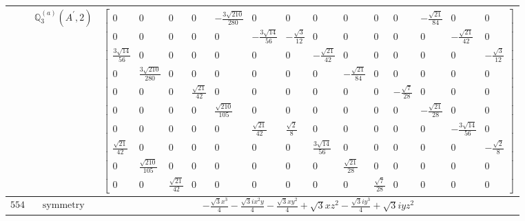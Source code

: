 \documentclass[fleqn,8pt,landscape]{jsarticle}
\begin{document}
\begin{longtable}{ccc}
$  $ & $ \mathbb{Q}_{3}^{(a)}(A^{\prime},2) $ & $ \begin{bmatrix} 0 & 0 & 0 & 0 & - \frac{3 \sqrt{210}}{280} & 0 & 0 & 0 & 0 & 0 & 0 & - \frac{\sqrt{21}}{84} & 0 & 0 \\ 0 & 0 & 0 & 0 & 0 & - \frac{3 \sqrt{14}}{56} & - \frac{\sqrt{3}}{12} & 0 & 0 & 0 & 0 & 0 & - \frac{\sqrt{21}}{42} & 0 \\ \frac{3 \sqrt{14}}{56} & 0 & 0 & 0 & 0 & 0 & 0 & - \frac{\sqrt{21}}{42} & 0 & 0 & 0 & 0 & 0 & - \frac{\sqrt{3}}{12} \\ 0 & \frac{3 \sqrt{210}}{280} & 0 & 0 & 0 & 0 & 0 & 0 & - \frac{\sqrt{21}}{84} & 0 & 0 & 0 & 0 & 0 \\ 0 & 0 & 0 & \frac{\sqrt{21}}{42} & 0 & 0 & 0 & 0 & 0 & 0 & - \frac{\sqrt{7}}{28} & 0 & 0 & 0 \\ 0 & 0 & 0 & 0 & \frac{\sqrt{210}}{105} & 0 & 0 & 0 & 0 & 0 & 0 & - \frac{\sqrt{21}}{28} & 0 & 0 \\ 0 & 0 & 0 & 0 & 0 & \frac{\sqrt{21}}{42} & \frac{\sqrt{2}}{8} & 0 & 0 & 0 & 0 & 0 & - \frac{3 \sqrt{14}}{56} & 0 \\ \frac{\sqrt{21}}{42} & 0 & 0 & 0 & 0 & 0 & 0 & \frac{3 \sqrt{14}}{56} & 0 & 0 & 0 & 0 & 0 & - \frac{\sqrt{2}}{8} \\ 0 & \frac{\sqrt{210}}{105} & 0 & 0 & 0 & 0 & 0 & 0 & \frac{\sqrt{21}}{28} & 0 & 0 & 0 & 0 & 0 \\ 0 & 0 & \frac{\sqrt{21}}{42} & 0 & 0 & 0 & 0 & 0 & 0 & \frac{\sqrt{7}}{28} & 0 & 0 & 0 & 0 \end{bmatrix} $ \\ \hline
$ 554 $ & $ \text{symmetry} $ & $ - \frac{\sqrt{3} x^{3}}{4} - \frac{\sqrt{3} i x^{2} y}{4} - \frac{\sqrt{3} x y^{2}}{4} + \sqrt{3} x z^{2} - \frac{\sqrt{3} i y^{3}}{4} + \sqrt{3} i y z^{2} $ \\

\end{longtable}
\end{document}

